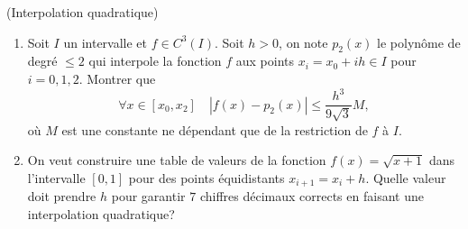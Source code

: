 \documentclass[a4paper,12pt,reqno]{amsart}
\begin{document}
\begin{exo} (Interpolation quadratique)
  \begin{enumerate}
    \item Soit $I$ un intervalle et $f\in C^3(I)$. Soit $h>0$, on note $p_2(x)$ le polynôme de degré $\leq 2$ qui interpole la fonction $f$ aux points $x_i=x_0+ih \in I$ pour $i=0,1,2$. Montrer que
      $$
        \forall x\in [x_0, x_2] \quad
          | {f(x)-p_2(x)} | \leq \frac{h^3}{9\sqrt{3}}M,
      $$
    où $M$ est une constante ne dépendant que de la restriction de $f$ à $I$.

  \item On veut construire une table de valeurs de la fonction $f(x)=\sqrt{x+1}$ dans l'intervalle $[0,1]$ pour des points équidistants $x_{i+1}=x_i+h$.\newline
  Quelle valeur doit prendre $h$ pour garantir $7$ chiffres décimaux corrects en faisant une interpolation quadratique?
  \end{enumerate}
\end{exo}
\end{document}
